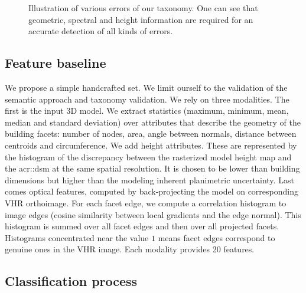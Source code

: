 \documentclass[conference]{IEEEtran}
\newcounter{SubFigCounter}
\begin{document}
\begin{figure}
\begin{center}
{{                }
                {
                    \renewcommand{\thesubfigure}{\roman{SubFigCounter}}
					\vspace{-.3cm}
                    \label{fig::fac_err}
                    \addtocounter{figure}{-1}
                }
            }
            {
            	\vspace{-.4cm}
                \caption{\label{fig::samples}Illustration of various errors of our taxonomy. One can see that geometric, spectral and height information are required for an accurate detection of all kinds of errors.}
            }
        \end{center}
    \end{figure}

\subsection{Feature baseline}

	We propose a simple handcrafted set. We limit ourself to the validation of the semantic approach and taxonomy validation. We rely on three modalities. The first is the input 3D model. We extract statistics (maximum, minimum, mean, median and standard deviation) over attributes that describe the geometry of the building facets: number of nodes, area, angle between normals, distance between centroids and circumference. We add height attributes. These are represented by the histogram of the discrepancy between the rasterized model height map and the \acrshort{acr::dsm} at the same spatial resolution. It is chosen to be lower than building dimensions but higher than the modeling inherent planimetric uncertainty. Last comes optical features, computed by back-projecting the model on corresponding VHR orthoimage. For each facet edge, we compute a correlation histogram to image edges (cosine similarity between local gradients and the edge normal). This histogram is summed over all facet edges and then over all projected facets. Histograms concentrated near the value $1$ means facet edges correspond to genuine ones in the VHR image. Each modality provides 20 features.

\subsection{Classification process}
\end{document}
